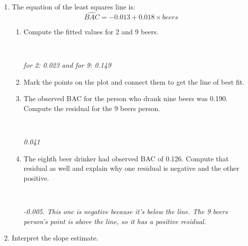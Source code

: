 \begin{enumerate}
\begin{enumerate}
\begin{key}
  {\it linear, strong, positive, $r = 0.90$ }
\end{key}

  \item The equation of the least squares line is:
  $$  \widehat{BAC} =  -0.013 + 0.018\times{beers}$$
  \begin{enumerate}
  \item Compute the fitted values for 2 and 9 beers.
\begin{students}
 \vspace{2cm}\\
\end{students}

\begin{key}
  {\it  for 2: 0.023  and for 9:  0.149}
\end{key}
   \item  Mark the points on the plot and connect them to get the line
     of best fit. \vspace{.2in}
   \item The observed BAC for the person who drank nine beers was 
     0.190. Compute the residual for the 9 beers person. 
\begin{students}
 \vspace{2cm}\\
\end{students}

\begin{key}
  {\it  0.041}
\end{key}
   \item  The eighth beer drinker had observed BAC of 0.126. Compute
     that residual as well and explain why one residual is negative
     and the other positive.
\begin{students}
 \vspace{2cm}\\
\end{students}

\begin{key}
  {\it  -0.005. This one is negative because it's below the line. The
    9 beers person's point is above the line, so it has a positive residual.}
\end{key}

\end{enumerate}
\item Interpret the slope estimate. 
\begin{students}
 \vspace{2cm}
\end{students}


\end{enumerate}
\end{enumerate}
